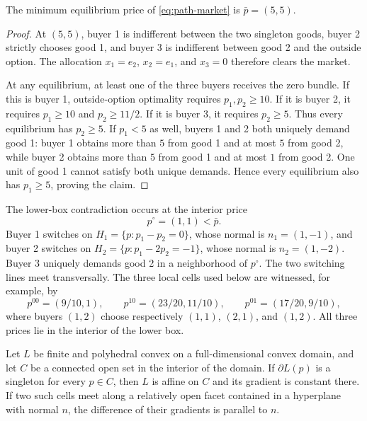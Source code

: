 \begin{lemma}\label{lem:path-minimum-equilibrium}
The minimum equilibrium price of \eqref{eq:path-market} is $\bar p=(5,5)$.
\end{lemma}

\begin{proof}
At $(5,5)$, buyer 1 is indifferent between the two singleton goods, buyer 2 strictly chooses good 1, and buyer 3 is indifferent between good 2 and the outside option. The allocation $x_1=e_2$, $x_2=e_1$, and $x_3=0$ therefore clears the market.

At any equilibrium, at least one of the three buyers receives the zero bundle. If this is buyer 1, outside-option optimality requires $p_1,p_2\ge10$. If it is buyer 2, it requires $p_1\ge10$ and $p_2\ge11/2$. If it is buyer 3, it requires $p_2\ge5$. Thus every equilibrium has $p_2\ge5$. If $p_1<5$ as well, buyers 1 and 2 both uniquely demand good 1: buyer 1 obtains more than $5$ from good 1 and at most $5$ from good 2, while buyer 2 obtains more than $5$ from good 1 and at most $1$ from good 2. One unit of good 1 cannot satisfy both unique demands. Hence every equilibrium also has $p_1\ge5$, proving the claim.
\end{proof}

The lower-box contradiction occurs at the interior price
\[
p^\circ=(1,1)<\bar p.
\]
Buyer 1 switches on $H_1=\{p:p_1-p_2=0\}$, whose normal is $n_1=(1,-1)$, and buyer 2 switches on $H_2=\{p:p_1-2p_2=-1\}$, whose normal is $n_2=(1,-2)$. Buyer 3 uniquely demands good 2 in a neighborhood of $p^\circ$. The two switching lines meet transversally. The three local cells used below are witnessed, for example, by
\[
p^{00}=(9/10,1),\qquad
p^{10}=(23/20,11/10),\qquad
p^{01}=(17/20,9/10),
\]
where buyers $(1,2)$ choose respectively $(1,1)$, $(2,1)$, and $(1,2)$. All three prices lie in the interior of the lower box.

\begin{lemma}\label{lem:polyhedral-cell-matching}
Let $L$ be finite and polyhedral convex on a full-dimensional convex domain, and let $C$ be a connected open set in the interior of the domain. If $\partial L(p)$ is a singleton for every $p\in C$, then $L$ is affine on $C$ and its gradient is constant there. If two such cells meet along a relatively open facet contained in a hyperplane with normal $n$, the difference of their gradients is parallel to $n$.
\end{lemma}

